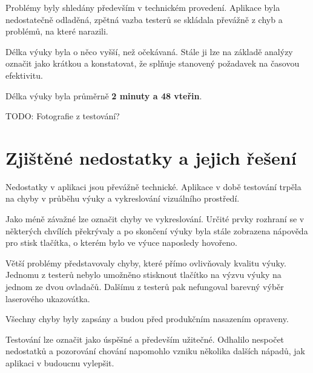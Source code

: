 Problémy byly shledány především v technickém provedení. Aplikace 
byla nedostatečně odladěná, zpětná vazba testerů se skládala 
převážně z chyb a problémů, na které narazili.

Délka výuky byla o něco vyšší, než očekávaná. Stále ji lze na základě analýzy označit
jako krátkou a konstatovat, že splňuje stanovený požadavek  na časovou efektivitu.

Délka výuky byla průměrně \textbf{2 minuty a 48 vteřin}.

TODO: Fotografie z testování?

\section{Zjištěné nedostatky a jejich řešení}\label{zjiux161tux11bnuxe9-nedostatky}

Nedostatky v aplikaci jsou převážně technické. Aplikace v době testování trpěla na
chyby v průběhu výuky a vykreslování vizuálního prostředí.

Jako méně závažné lze označit chyby ve vykreslování. Určité prvky rozhraní se v některých
chvílích překrývaly a po skončení výuky byla stále zobrazena nápověda pro stisk
tlačítka, o kterém bylo ve výuce naposledy hovořeno.

Větší problémy představovaly chyby, které přímo ovlivňovaly kvalitu 
výuky. Jednomu z testerů nebylo umožněno stisknout tlačítko na výzvu 
výuky na jednom ze dvou ovladačů. Dalšímu z testerů pak nefungoval 
barevný výběr laserového ukazovátka.

Všechny chyby byly zapsány a budou před produkčním nasazením opraveny.

Testování lze označit jako úspěšné a především užitečné. Odhalilo 
nespočet nedostatků a pozorování chování napomohlo vzniku
několika dalších nápadů, jak aplikaci v budoucnu vylepšit.